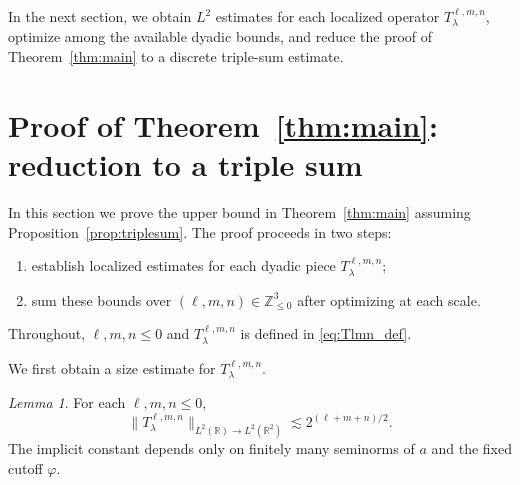 \documentclass[10pt]{amsart}
\numberwithin{equation}{section}
\theoremstyle{definition}
\theoremstyle{remark}
\theoremstyle{remark}
\newtheorem{lemma}{Lemma}
\newcommand{\R}{\mathbb{R}}
\newcommand{\Z}{\mathbb{Z}}
\begin{document}
	
	In the next section, we obtain $L^2$ estimates for each localized operator \(T_\lambda^{\ell,m,n}\), optimize among the available dyadic bounds, and reduce the proof of Theorem~\ref{thm:main} to a discrete triple-sum estimate.










	
	
	
	
	
	
	\section{Proof of Theorem~\ref{thm:main}: reduction to a triple sum}\label{sec:thm_main}
	
	In this section we prove the upper bound in Theorem~\ref{thm:main} assuming
	Proposition~\ref{prop:triplesum}. The proof proceeds in two steps:
	\begin{enumerate}[label=\textup{(\arabic*)},leftmargin=2.2em]
		\item establish localized estimates for each dyadic piece $T_\lambda^{\ell,m,n}$;
		\item sum these bounds over $(\ell,m,n)\in\Z_{\le0}^3$ after optimizing at each scale.
	\end{enumerate}
	Throughout, $\ell,m,n\le 0$ and $T_\lambda^{\ell,m,n}$ is defined in \eqref{eq:Tlmn_def}.
	
	We first obtain a size estimate for $T_\lambda^{\ell,m,n}$.
	
	\begin{lemma}\label{lem:size}
		For each $\ell,m,n\le 0$,
		\begin{equation*}
			\|T_{\lambda}^{\ell,m,n}\|_{L^2(\R)\to L^2(\R^2)}
			\lesssim 2^{(\ell+m+n)/2}.
		\end{equation*}
		The implicit constant depends only on finitely many seminorms of $a$ and the fixed cutoff $\varphi$.
	\end{lemma}
	
\end{document}
